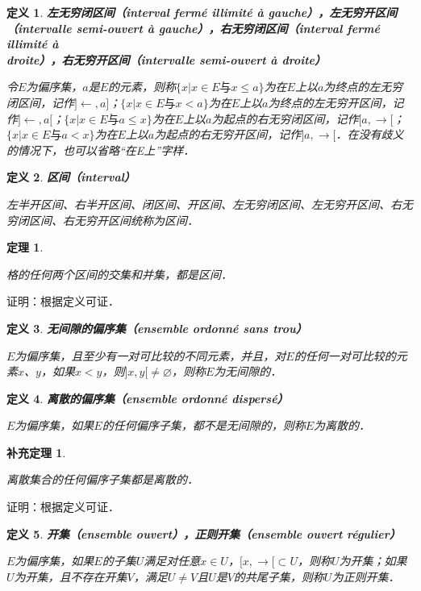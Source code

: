 \documentclass[12pt, a4paper, oneside]{book}
\newtheorem{theo}{定理}
\newtheorem{cor}{补充定理}
\newtheorem{de}{定义}
\begin{document}
			\begin{de}
				\textbf{左无穷闭区间（interval fermé illimité à gauche），左无穷开区间\\（intervalle semi-ouvert à gauche），右无穷闭区间（interval fermé illimité à \\droite），右无穷开区间（intervalle semi-ouvert à droite）}
				\par
				令$E$为偏序集，$a$是$E$的元素，则称$\{x|x\in E\text{与}x\leq a\}$为在$E$上以$a$为终点的左无穷闭区间，记作$]\gets, a]$；$\{x|x\in E\text{与}x<a\}$为在$E$上以$a$为终点的左无穷开区间，记作$]\gets, a[$；$\{x|x\in E\text{与}a\leq x\}$为在$E$上以$a$为起点的右无穷闭区间，记作$[a, \to [$；$\{x|x\in E\text{与}a<x\}$为在$E$上以$a$为起点的右无穷开区间，记作$]a, \to [$．在没有歧义的情况下，也可以省略“在E上”字样．
			\end{de}
			
			\begin{de}
				\textbf{区间（interval）}
				\par
				左半开区间、右半开区间、闭区间、开区间、左无穷闭区间、左无穷开区间、右无穷闭区间、右无穷开区间统称为区间．
			\end{de}
						
			\begin{theo}\label{theo71}
				\hfill\par
				格的任何两个区间的交集和并集，都是区间．
			\end{theo}
			证明：根据定义可证．

			\begin{de}
				\textbf{无间隙的偏序集（ensemble ordonné sans trou）}
				\par
				$E$为偏序集，且至少有一对可比较的不同元素，并且，对$E$的任何一对可比较的元素$x$、$y$，如果$x<y$，则$]x, y[\neq \varnothing$，则称$E$为无间隙的．				
			\end{de}

			\begin{de}
				\textbf{离散的偏序集（ensemble ordonné dispersé）}
				\par
				$E$为偏序集，如果$E$的任何偏序子集，都不是无间隙的，则称$E$为离散的．
			\end{de}
			
			\begin{cor}\label{cor205}
				\hfill\par
				离散集合的任何偏序子集都是离散的．
			\end{cor}
			证明：根据定义可证．

			\begin{de}
				\textbf{开集（ensemble ouvert），正则开集（ensemble ouvert régulier）}
				\par
				$E$为偏序集，如果$E$的子集$U$满足对任意$x\in U$，$[x, \to [\subset U$，则称$U$为开集；如果$U$为开集，且不存在开集$V$，满足$U\neq V$且$U$是$V$的共尾子集，则称$U$为正则开集．
			\end{de}
			
\end{document}
